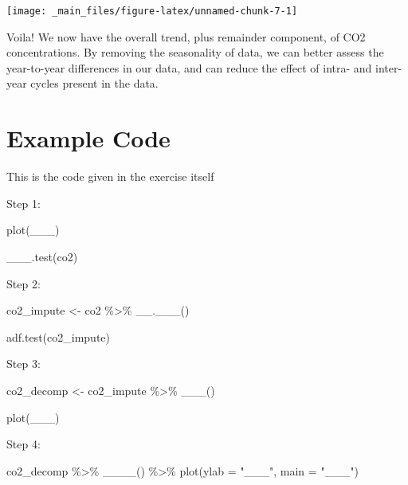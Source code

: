 \documentclass[
]{book}
\newenvironment{Shaded}{\begin{snugshade}}{\end{snugshade}}
\newcommand{\AttributeTok}[1]{\textcolor[rgb]{0.77,0.63,0.00}{#1}}
\newcommand{\FunctionTok}[1]{\textcolor[rgb]{0.00,0.00,0.00}{#1}}
\newcommand{\NormalTok}[1]{#1}
\newcommand{\OtherTok}[1]{\textcolor[rgb]{0.56,0.35,0.01}{#1}}
\newcommand{\SpecialCharTok}[1]{\textcolor[rgb]{0.00,0.00,0.00}{#1}}
\newcommand{\StringTok}[1]{\textcolor[rgb]{0.31,0.60,0.02}{#1}}
\begin{document}
\begin{center}\texttt{[image: \_main\_files/figure-latex/unnamed-chunk-7-1]} \end{center}

Voila! We now have the overall trend, plus remainder component, of CO2 concentrations. By removing the seasonality of data, we can better assess the year-to-year differences in our data, and can reduce the effect of intra- and inter-year cycles present in the data.

\hypertarget{example-code}{%
\section{Example Code}\label{example-code}}

This is the code given in the exercise itself

Step 1:

\begin{Shaded}
\begin{Highlighting}[]
\FunctionTok{plot}\NormalTok{(\_\_\_)}

\FunctionTok{\_\_\_.test}\NormalTok{(co2)}
\end{Highlighting}
\end{Shaded}

Step 2:

\begin{Shaded}
\begin{Highlighting}[]
\NormalTok{co2\_impute }\OtherTok{\textless{}{-}}\NormalTok{ co2 }\SpecialCharTok{\%\textgreater{}\%} 
  \FunctionTok{\_\_.\_\_\_}\NormalTok{()}

\FunctionTok{adf.test}\NormalTok{(co2\_impute)}
\end{Highlighting}
\end{Shaded}

Step 3:

\begin{Shaded}
\begin{Highlighting}[]
\NormalTok{co2\_decomp }\OtherTok{\textless{}{-}}\NormalTok{ co2\_impute }\SpecialCharTok{\%\textgreater{}\%} 
  \FunctionTok{\_\_\_}\NormalTok{()}

\FunctionTok{plot}\NormalTok{(\_\_\_)}
\end{Highlighting}
\end{Shaded}

Step 4:

\begin{Shaded}
\begin{Highlighting}[]
\NormalTok{co2\_decomp }\SpecialCharTok{\%\textgreater{}\%} 
  \FunctionTok{\_\_\_\_}\NormalTok{() }\SpecialCharTok{\%\textgreater{}\%} 
  \FunctionTok{plot}\NormalTok{(}\AttributeTok{ylab =} \StringTok{"\_\_\_"}\NormalTok{, }\AttributeTok{main =} \StringTok{"\_\_\_"}\NormalTok{)}
\end{Highlighting}
\end{Shaded}


  
\end{document}
